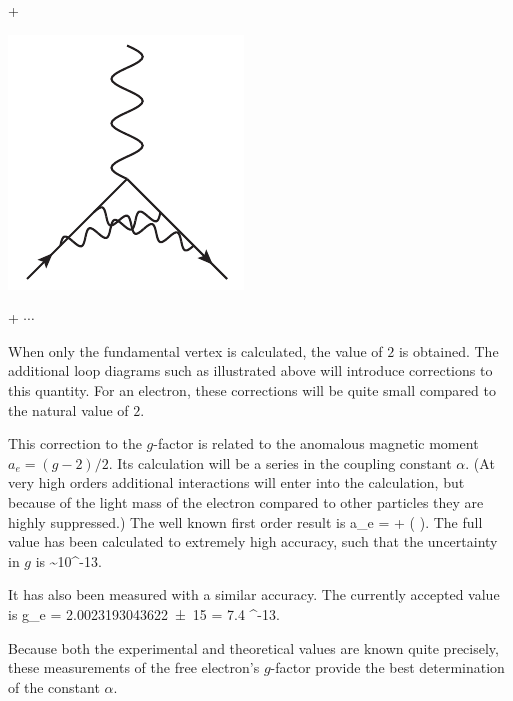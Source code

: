 {\begin{minipage}{1in}
\end{minipage}
+
\begin{minipage}{1in}
   \begin{center} \includegraphics[scale=0.5]{eps/QEDloop2} \end{center} 
\end{minipage}
+ \hspace{2em} $\cdots$
 }
\vspace{1em} 
 
When only the fundamental vertex is calculated, the value of $2$ is obtained.  The additional loop diagrams such as illustrated above will introduce corrections to this quantity.  For an electron, these corrections will be quite small compared to the natural value of $2$. 
 
 
 
This correction to the $g$-factor is related to the anomalous magnetic moment $a_e = (g-2)/2$.  Its calculation will be a series in the coupling constant $\alpha$.   (At very high orders additional interactions will enter into the calculation, but because of the light mass of the electron compared to other particles they are highly suppressed.)  The well known first order result is
 \beq
 	a_e = \frac{\alpha}{2\pi} + ( ).
 \eeq
The full value has been calculated to extremely high accuracy, such that the uncertainty in $g$ is 
\beq
	 \sim 10^{-13}.
\eeq

It has also been measured with a similar accuracy.  The currently accepted value \cite{Gabrielse:2006gg} is 
\beq
	g_e = \num{2.002 319 304 3622(15)}    \hspace{2em} \delta = 7.4 ^{-13}.
\eeq

Because both the experimental and theoretical values are known quite precisely, these measurements of the free electron's $g$-factor provide the best determination of the constant $\alpha$.  

